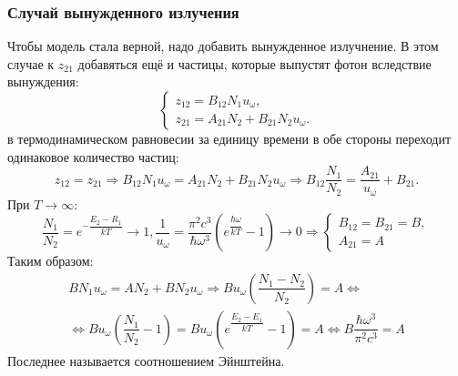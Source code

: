 \subsubsection{Случай вынужденного излучения}
Чтобы модель стала верной, надо добавить вынужденное излучнение. В этом случае к $z_{21}$ добавяться
ещё и частицы, которые выпустят фотон вследствие вынуждения:
\[
  \begin{cases}
    z_{12} = B_{12} N_1 u_\omega, \\
    z_{21} = A_{21} N_2 + B_{21} N_2 u_\omega.
  \end{cases}
\]
в термодинамическом равновесии за единицу времени в обе стороны переходит одинаковое количество 
частиц:
\begin{equation}\label{write_1:good_einstein}
  z_{12} = z_{21} \Rightarrow
  B_{12} N_1 u_\omega = A_{21} N_2 + B_{21} N_2 u_\omega
  \Rightarrow
  B_{12} \dfrac{N_1}{N_2} = \dfrac{A_{21}}{u_\omega} + B_{21}.
\end{equation}
При $T \to \infty$:
\[
  \dfrac{N_1}{N_2} = e^{- \dfrac{E_2-R_1}{kT}} \to 1,
  \dfrac{1}{u_\omega} = \dfrac{\pi^2 c^3}{\hbar \omega^3} \left(e^{\dfrac{\hbar \omega}{kT}} - 1\right) \to 0
  \Rightarrow
  \begin{cases}
    B_{12} = B_{21} = B, \\
    A_{21} = A 
  \end{cases}
\]
Таким образом:
\begin{multline*}
  B N_1 u_\omega = A N_2 + B N_2 u_\omega
  \Rightarrow
  B u_\omega \left( \dfrac{N_1-N_2}{N_2} \right) = A
  \Leftrightarrow \\
  \Leftrightarrow
  B u_\omega \left( \dfrac{N_1}{N_2} - 1 \right) = B u_\omega \left( e^{\dfrac{E_2-E_1}{kT}} - 1 \right) = A
  \Leftrightarrow
  B \dfrac{\hbar \omega^3}{\pi^2 c^3} = A
\end{multline*}
Последнее называется соотношением Эйнштейна.
